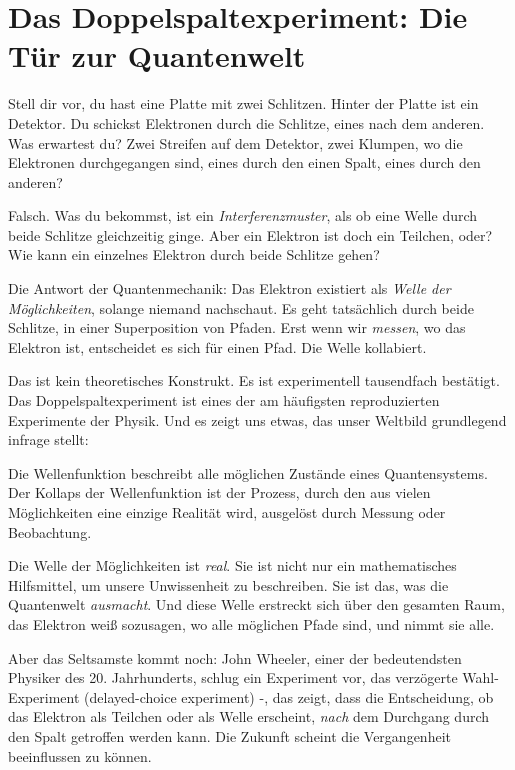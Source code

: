 \section{Das Doppelspaltexperiment: Die Tür zur Quantenwelt}

Stell dir vor, du hast eine Platte mit zwei Schlitzen. Hinter der Platte ist ein Detektor. Du schickst Elektronen durch die Schlitze, eines nach dem anderen. Was erwartest du? Zwei Streifen auf dem Detektor, zwei Klumpen, wo die Elektronen durchgegangen sind, eines durch den einen Spalt, eines durch den anderen?

Falsch. Was du bekommst, ist ein \emph{Interferenzmuster}, als ob eine Welle durch beide Schlitze gleichzeitig ginge. Aber ein Elektron ist doch ein Teilchen, oder? Wie kann ein einzelnes Elektron durch beide Schlitze gehen?

Die Antwort der Quantenmechanik: Das Elektron existiert als \emph{Welle der Möglichkeiten}, solange niemand nachschaut. Es geht tatsächlich durch beide Schlitze, in einer Superposition von Pfaden. Erst wenn wir \emph{messen}, wo das Elektron ist, entscheidet es sich für einen Pfad. Die Welle kollabiert.

Das ist kein theoretisches Konstrukt. Es ist experimentell tausendfach bestätigt. Das Doppelspaltexperiment ist eines der am häufigsten reproduzierten Experimente der Physik. Und es zeigt uns etwas, das unser Weltbild grundlegend infrage stellt:

\begin{defi}
	Die Wellenfunktion beschreibt alle möglichen Zustände eines Quantensystems. Der Kollaps der Wellenfunktion ist der Prozess, durch den aus vielen Möglichkeiten eine einzige Realität wird, ausgelöst durch Messung oder Beobachtung.
\end{defi}

Die Welle der Möglichkeiten ist \emph{real}. Sie ist nicht nur ein mathematisches Hilfsmittel, um unsere Unwissenheit zu beschreiben. Sie ist das, was die Quantenwelt \emph{ausmacht}. Und diese Welle erstreckt sich über den gesamten Raum, das Elektron \glqq weiß\grqq{} sozusagen, wo alle möglichen Pfade sind, und \glqq nimmt\grqq{} sie alle.

Aber das Seltsamste kommt noch: John Wheeler, einer der bedeutendsten Physiker des 20. Jahrhunderts, schlug ein Experiment vor, das \glqq verzögerte Wahl\grqq-Experiment (delayed-choice experiment) -, das zeigt, dass die Entscheidung, ob das Elektron als Teilchen oder als Welle erscheint, \emph{nach} dem Durchgang durch den Spalt getroffen werden kann. Die Zukunft scheint die Vergangenheit beeinflussen zu können.

